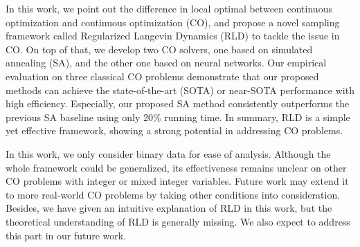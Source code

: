 In this work, we point out the difference in local optimal between continuous optimization and continuous optimization (CO), and propose a novel sampling framework called Regularized Langevin Dynamics (RLD) to tackle the issue in CO. On top of that, we develop two CO solvers, one based on simulated annealing (SA), and the other one based on neural networks. Our empirical evaluation on three classical CO problems demonstrate that our proposed methods can achieve the state-of-the-art (SOTA) or near-SOTA performance with high efficiency. Especially, our proposed SA method consistently outperforms the previous SA baseline  using only 20\% running time. In summary, RLD is a simple yet effective framework, showing a strong potential in addressing CO problems.

In this work, we only consider binary data for ease of analysis. Although the whole framework could be generalized, its effectiveness remains unclear on other CO problems with integer or mixed integer variables. Future work may extend it to more real-world CO problems by taking other conditions into consideration. Besides, we have given an intuitive explanation of RLD in this work, but the theoretical understanding of RLD is generally missing. We also expect to address this part in our future work.